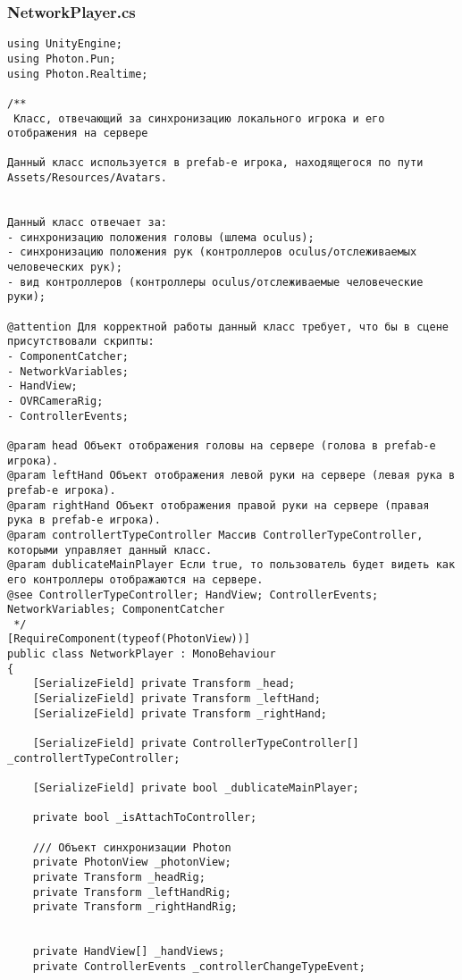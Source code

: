\subsubsection*{NetworkPlayer.cs}
\begin{verbatim}
﻿using UnityEngine;
using Photon.Pun;
using Photon.Realtime;

/**
 Класс, отвечающий за синхронизацию локального игрока и его отображения на сервере

Данный класс используется в prefab-е игрока, находящегося по пути Assets/Resources/Avatars.


Данный класс отвечает за:
- синхронизацию положения головы (шлема oculus);
- синхронизацию положения рук (контроллеров oculus/отслеживаемых человеческих рук);
- вид контроллеров (контроллеры oculus/отслеживаемые человеческие руки);

@attention Для корректной работы данный класс требует, что бы в сцене присутствовали скрипты:
- ComponentCatcher;
- NetworkVariables;
- HandView;
- OVRCameraRig;
- ControllerEvents;

@param head Объект отображения головы на сервере (голова в prefab-е игрока).
@param leftHand Объект отображения левой руки на сервере (левая рука в prefab-е игрока).
@param rightHand Объект отображения правой руки на сервере (правая рука в prefab-е игрока).
@param controllertTypeController Массив ControllerTypeController, которыми управляет данный класс.
@param dublicateMainPlayer Если true, то пользователь будет видеть как его контроллеры отображаются на сервере.
@see ControllerTypeController; HandView; ControllerEvents; NetworkVariables; ComponentCatcher
 */
[RequireComponent(typeof(PhotonView))]
public class NetworkPlayer : MonoBehaviour
{
    [SerializeField] private Transform _head;
    [SerializeField] private Transform _leftHand;
    [SerializeField] private Transform _rightHand;

    [SerializeField] private ControllerTypeController[] _controllertTypeController;

    [SerializeField] private bool _dublicateMainPlayer;

    private bool _isAttachToController;

    /// Объект синхронизации Photon
    private PhotonView _photonView;
    private Transform _headRig;
    private Transform _leftHandRig;
    private Transform _rightHandRig;


    private HandView[] _handViews;
    private ControllerEvents _controllerChangeTypeEvent;


\end{verbatim}
